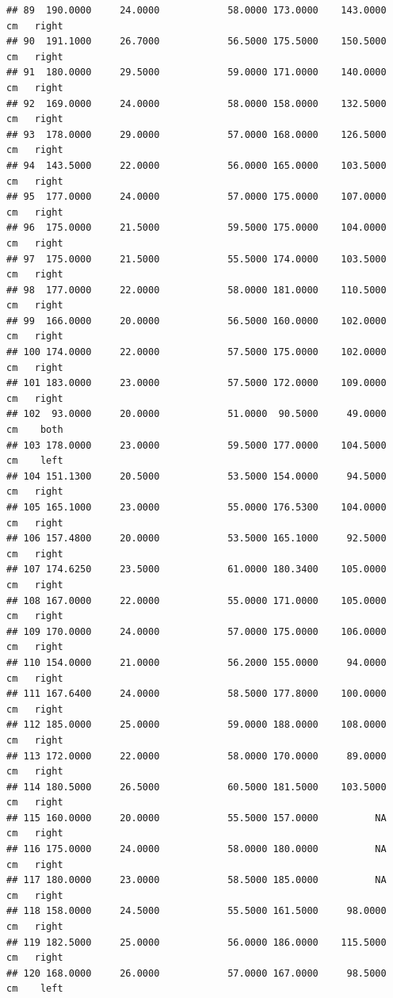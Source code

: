 \documentclass[]{article}
\begin{document}
\begin{verbatim}
## 89  190.0000     24.0000            58.0000 173.0000    143.0000     cm   right
## 90  191.1000     26.7000            56.5000 175.5000    150.5000     cm   right
## 91  180.0000     29.5000            59.0000 171.0000    140.0000     cm   right
## 92  169.0000     24.0000            58.0000 158.0000    132.5000     cm   right
## 93  178.0000     29.0000            57.0000 168.0000    126.5000     cm   right
## 94  143.5000     22.0000            56.0000 165.0000    103.5000     cm   right
## 95  177.0000     24.0000            57.0000 175.0000    107.0000     cm   right
## 96  175.0000     21.5000            59.5000 175.0000    104.0000     cm   right
## 97  175.0000     21.5000            55.5000 174.0000    103.5000     cm   right
## 98  177.0000     22.0000            58.0000 181.0000    110.5000     cm   right
## 99  166.0000     20.0000            56.5000 160.0000    102.0000     cm   right
## 100 174.0000     22.0000            57.5000 175.0000    102.0000     cm   right
## 101 183.0000     23.0000            57.5000 172.0000    109.0000     cm   right
## 102  93.0000     20.0000            51.0000  90.5000     49.0000     cm    both
## 103 178.0000     23.0000            59.5000 177.0000    104.5000     cm    left
## 104 151.1300     20.5000            53.5000 154.0000     94.5000     cm   right
## 105 165.1000     23.0000            55.0000 176.5300    104.0000     cm   right
## 106 157.4800     20.0000            53.5000 165.1000     92.5000     cm   right
## 107 174.6250     23.5000            61.0000 180.3400    105.0000     cm   right
## 108 167.0000     22.0000            55.0000 171.0000    105.0000     cm   right
## 109 170.0000     24.0000            57.0000 175.0000    106.0000     cm   right
## 110 154.0000     21.0000            56.2000 155.0000     94.0000     cm   right
## 111 167.6400     24.0000            58.5000 177.8000    100.0000     cm   right
## 112 185.0000     25.0000            59.0000 188.0000    108.0000     cm   right
## 113 172.0000     22.0000            58.0000 170.0000     89.0000     cm   right
## 114 180.5000     26.5000            60.5000 181.5000    103.5000     cm   right
## 115 160.0000     20.0000            55.5000 157.0000          NA     cm   right
## 116 175.0000     24.0000            58.0000 180.0000          NA     cm   right
## 117 180.0000     23.0000            58.5000 185.0000          NA     cm   right
## 118 158.0000     24.5000            55.5000 161.5000     98.0000     cm   right
## 119 182.5000     25.0000            56.0000 186.0000    115.5000     cm   right
## 120 168.0000     26.0000            57.0000 167.0000     98.5000     cm    left

\end{verbatim}
\end{document}
